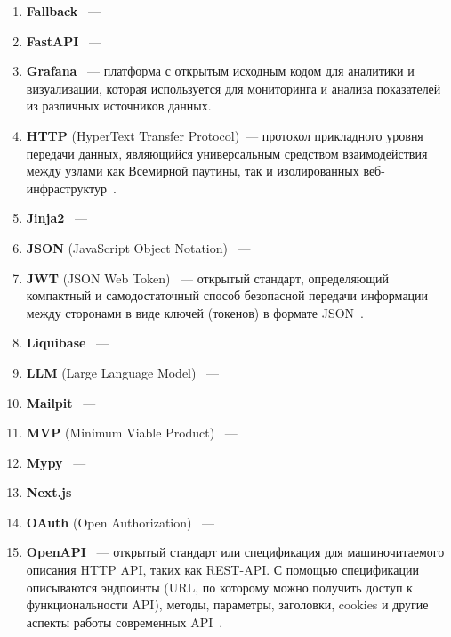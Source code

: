 \begin{enumerate}
    \item \textbf{Fallback} ~--- 
    
    \item \textbf{FastAPI} ~--- 
    
    \item \textbf{Grafana} ~--- платформа с открытым исходным кодом для аналитики и визуализации, которая используется для мониторинга и анализа показателей из различных источников данных.  
    
    \item \textbf{HTTP} (HyperText Transfer Protocol)~--- протокол прикладного уровня передачи данных, являющийся универсальным средством взаимодействия между узлами как Всемирной паутины, так и изолированных веб-инфраструктур~\cite{http_def}. 
    
    \item \textbf{Jinja2} ~--- 
    
    \item \textbf{JSON} (JavaScript Object Notation) ~--- 
    
    \item \textbf{JWT} (JSON Web Token) ~--- открытый стандарт, определяющий компактный и самодостаточный способ безопасной передачи информации между сторонами в виде ключей (токенов) в формате JSON~\cite{jwt}.  
    
    \item \textbf{Liquibase} ~--- 
    
    \item \textbf{LLM} (Large Language Model) ~--- 
    
    \item \textbf{Mailpit} ~--- 
    
    \item \textbf{MVP} (Minimum Viable Product) ~--- 
    
    \item \textbf{Mypy} ~--- 
    
    \item \textbf{Next.js} ~--- 
    
    \item \textbf{OAuth} (Open Authorization) ~--- 
    
    \item \textbf{OpenAPI} ~--- открытый стандарт или спецификация для машиночитаемого описания HTTP API, таких как REST-API. 
    С помощью спецификации описываются эндпоинты (URL, по которому можно получить доступ к функциональности API), методы, параметры, заголовки, cookies и другие аспекты работы современных API~\cite{openapi_def}.


\end{enumerate}
